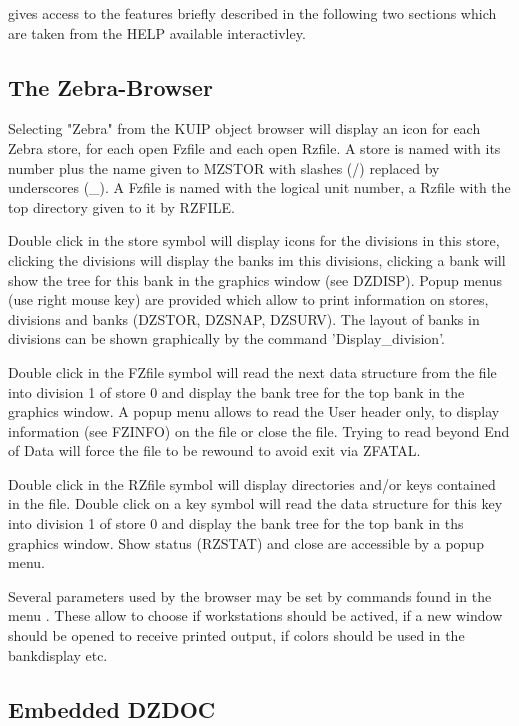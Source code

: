  
gives access to the features briefly described in the following two
sections which are taken from the HELP available interactivley.
 
\subsection{The Zebra-Browser}
 
Selecting "Zebra" from the KUIP object browser will display
an icon for each Zebra store, for each open Fzfile and each
open Rzfile. A store is named with its number plus the name
given to MZSTOR with slashes (/) replaced by underscores (\_).
A Fzfile is named with the logical unit number, a Rzfile with
the top directory given to it by RZFILE.
 
Double click in the store symbol will display icons for the
divisions in this store, clicking the divisions will display
the banks im this divisions, clicking a bank will show the
tree for this bank in the graphics window (see DZDISP).
Popup menus (use right mouse key) are provided which allow to
print information on stores, divisions and banks (DZSTOR,
DZSNAP, DZSURV). The layout of banks in divisions can be
shown graphically by the command 'Display\_division'.
 
Double click in the FZfile symbol will read the next data
structure from the file into division 1 of store 0 and
display the bank tree for the top bank in the graphics
window. A popup menu allows to read the User header only,
to display information (see FZINFO) on the file or close the
file. Trying to read beyond End of Data will force the
file to be rewound to avoid exit via ZFATAL.
 
Double click in the RZfile symbol will display directories
and/or keys contained in the file. Double click on a key
symbol will read the data structure for this key into
division 1 of store 0 and display the bank tree for the
top bank in ths graphics window. Show status (RZSTAT) and
close are accessible by a popup menu.
 
Several parameters used by the browser may be set by commands
found in the menu . These allow to choose
if workstations should be actived, if a new window should be opened
to receive printed output, if colors should be used in the 
bankdisplay etc.
 
\subsection{Embedded DZDOC}
 
